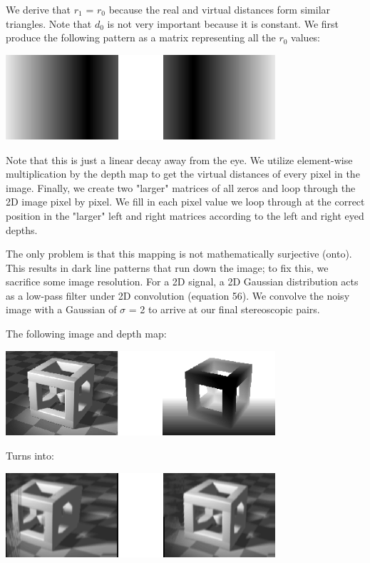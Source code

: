 \documentclass[12pt]{article}
\begin{document}
We derive that \(r_{1}\) = \(r_{0}\) because the real and virtual distances form similar triangles. Note that \(d_{0}\) is not very important because it is constant. We first produce the following pattern as a matrix representing all the \(r_{0}\) values:

\begin{center}
\includegraphics[width=100mm]{eye_distances.png}
\end{center}

Note that this is just a linear decay away from the eye. We utilize element-wise multiplication by the depth map to get the virtual distances of every pixel in the image. Finally, we create two "larger" matrices of all zeros and loop through the 2D image pixel by pixel. We fill in each pixel value we loop through at the correct position in the "larger" left and right matrices according to the left and right eyed depths.

The only problem is that this mapping is not mathematically surjective (onto). This results in dark line patterns that run down the image; to fix this, we sacrifice some image resolution. For a 2D signal, a 2D Gaussian distribution acts as a low-pass filter under 2D convolution (equation 56). We convolve the noisy image with a Gaussian of \(\sigma\) = 2 to arrive at our final stereoscopic pairs.

The following image and depth map:

\begin{center}
\includegraphics[width=100mm]{image_depth_pair.png}
\end{center}

Turns into:

\begin{center}
\includegraphics[width=100mm]{stereoscopic_pair.png}
\end{center}
\end{document}
